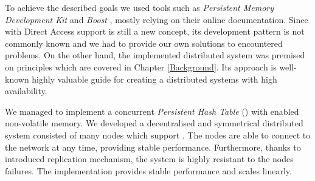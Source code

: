 To achieve the described goals we used tools such as \textit{Persistent Memory Development Kit} \cite{PmemIo} and \textit{Boost} \cite{Asio}, mostly relying on their online documentation.
Since \NVM with Direct Access support is still a new concept, its development pattern is not commonly known and we had to provide our own solutions to encountered problems.
On the other hand, the implemented distributed system was premised on \Dynamo \cite{AmazonDynamo} principles which are covered in Chapter \ref{Background}.
Its approach is well-known highly valuable guide for creating a distributed systems with high availability.

We managed to implement a concurrent \textit{Persistent Hash Table} (\PHT) with enabled non-volatile memory. 
We developed a decentralised and symmetrical distributed system consisted of many nodes which support \PHT.
The nodes are able to connect to the network at any time, providing stable performance.
Furthermore, thanks to introduced replication mechanism, the system is highly resistant to the nodes failures.
The implementation provides stable performance and scales linearly.




